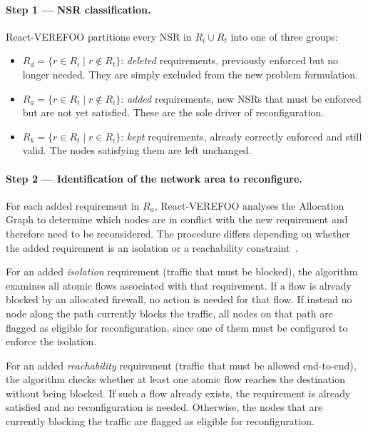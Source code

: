\paragraph{Step 1 — NSR classification.} React-VEREFOO partitions every NSR in $R_i \cup R_t$ into one of three groups:
\begin{itemize}
  \item $R_d = \{r \in R_i \mid r \notin R_t\}$: \textit{deleted} requirements, previously enforced but no longer needed. They are simply excluded from the new problem formulation.
  \item $R_a = \{r \in R_t \mid r \notin R_i\}$: \textit{added} requirements, new NSRs that must be enforced but are not yet satisfied. These are the sole driver of reconfiguration.
  \item $R_k = \{r \in R_t \mid r \in R_i\}$: \textit{kept} requirements, already correctly enforced and still valid. The nodes satisfying them are left unchanged.
\end{itemize}

\paragraph{Step 2 — Identification of the network area to reconfigure.} For each added requirement in $R_a$, React-VEREFOO analyses the Allocation Graph to determine which nodes are in conflict with the new requirement and therefore need to be reconsidered. The procedure differs depending on whether the added requirement is an isolation or a reachability constraint~\cite{reactverefoo}.

For an added \textit{isolation} requirement (traffic that must be blocked), the algorithm examines all atomic flows associated with that requirement. If a flow is already blocked by an allocated firewall, no action is needed for that flow. If instead no node along the path currently blocks the traffic, all nodes on that path are flagged as eligible for reconfiguration, since one of them must be configured to enforce the isolation.

For an added \textit{reachability} requirement (traffic that must be allowed end-to-end), the algorithm checks whether at least one atomic flow reaches the destination without being blocked. If such a flow already exists, the requirement is already satisfied and no reconfiguration is needed. Otherwise, the nodes that are currently blocking the traffic are flagged as eligible for reconfiguration.


